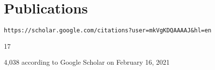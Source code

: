 \documentclass{article}
\begin{document}
%
%

\vspace{\parskip}
\section{Publications}
\begin{description}[widest=Google Scholar Page] %
    \item[Google Scholar Page] \begin{verbatim}https://scholar.google.com/citations?user=mkVgKDQAAAAJ&hl=en\end{verbatim}
    \item[H-Index] 17
    \item[Total Citations] 4,038 according to Google Scholar on February 16, 2021
\end{description}
\end{document}

